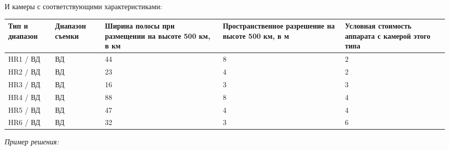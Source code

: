 И камеры с соответствующими характеристиками:

\begin{table}[H]
    \begin{center}
        \begin{tabular}{|p{2cm}|p{2cm}|p{3cm}|p{3cm}|p{3cm}|}
            \hline Тип и диапазон &Диапазон съемки & Ширина полосы при размещении на высоте 500 км, в км & Пространственное разрешение на высоте 500 км, в м & Условная стоимость аппарата с камерой этого типа \\
            \hline
            HR1 / ВД & ВД & 44 & 8 & 2 \\
            \hline
            HR2 / ВД & ВД & 23 & 4 & 2 \\
            \hline
            HR3 / ВД & ВД & 16 & 3 & 3 \\
            \hline
            HR4 / ВД & ВД & 88 & 8 & 4 \\
            \hline
            HR5 / ВД & ВД & 47 & 4 & 4 \\
            \hline
            HR6 / ВД & ВД & 32 & 3 & 6 \\ 
            \hline
        \end{tabular}
    \end{center}
\end{table}

\textit{Пример решения:}





